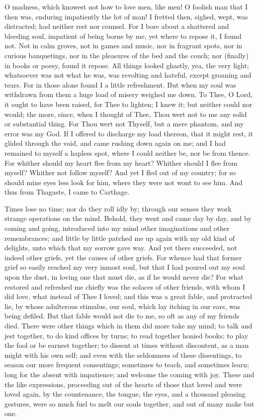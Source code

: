 \documentclass[b5paper,openright,12pt,twoside]{book}
\begin{document}
O madness, which knowest not how to love men, like men! O foolish man
that I then was, enduring impatiently the lot of man! I fretted then,
sighed, wept, was distracted; had neither rest nor counsel. For I bore
about a shattered and bleeding soul, impatient of being borne by me, yet
where to repose it, I found not. Not in calm groves, not in games and
music, nor in fragrant spots, nor in curious banquetings, nor in the
pleasures of the bed and the couch; nor (finally) in books or poesy,
found it repose. All things looked ghastly, yea, the very light;
whatsoever was not what he was, was revolting and hateful, except
groaning and tears. For in those alone found I a little refreshment. But
when my soul was withdrawn from them a huge load of misery weighed
me down. To Thee, O Lord, it ought to have been raised, for Thee to
lighten; I knew it; but neither could nor would; the more, since, when I
thought of Thee, Thou wert not to me any solid or substantial thing. For
Thou wert not Thyself, but a mere phantom, and my error was my God. If
I offered to discharge my load thereon, that it might rest, it glided
through the void, and came rushing down again on me; and I had remained
to myself a hapless spot, where I could neither be, nor be from thence.
For whither should my heart flee from my heart? Whither should I
flee from myself? Whither not follow myself? And yet I fled out of my
country; for so should mine eyes less look for him, where they were not
wont to see him. And thus from Thagaste, I came to Carthage.

Times lose no time; nor do they roll idly by; through our senses they
work strange operations on the mind. Behold, they went and came day by
day, and by coming and going, introduced into my mind other imaginations
and other remembrances; and little by little patched me up again with my
old kind of delights, unto which that my sorrow gave way. And yet there
succeeded, not indeed other griefs, yet the causes of other griefs. For
whence had that former grief so easily reached my very inmost soul, but
that I had poured out my soul upon the dust, in loving one that must
die, as if he would never die? For what restored and refreshed me
chiefly was the solaces of other friends, with whom I did love, what
instead of Thee I loved; and this was a great fable, and protracted lie,
by whose adulterous stimulus, our soul, which lay itching in our ears,
was being defiled. But that fable would not die to me, so oft as any of
my friends died. There were other things which in them did more take my
mind; to talk and jest together, to do kind offices by turns; to read
together honied books; to play the fool or be earnest together; to
dissent at times without discontent, as a man might with his own self;
and even with the seldomness of these dissentings, to season our more
frequent consentings; sometimes to teach, and sometimes learn; long for
the absent with impatience; and welcome the coming with joy. These and
the like expressions, proceeding out of the hearts of those that loved
and were loved again, by the countenance, the tongue, the eyes, and
a thousand pleasing gestures, were so much fuel to melt our souls
together, and out of many make but one.
\end{document}

